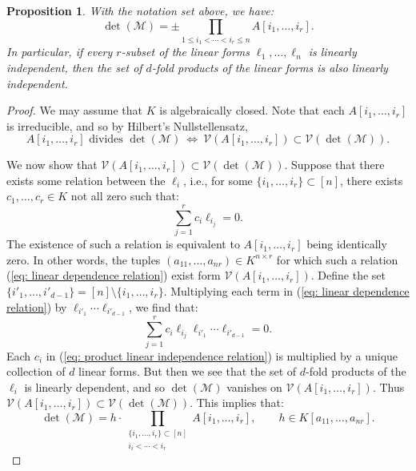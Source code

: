 \documentclass [a4paper,reqno, 11pt]{amsart}
\theoremstyle{plain}
\theoremstyle{plain}
\theoremstyle{plain}
\newtheorem{proposition}[theorem]{Proposition}
\theoremstyle{plain}
\theoremstyle{definition}
\theoremstyle{definition}
\theoremstyle{definition}
\theoremstyle{definition}
\theoremstyle{definition}
\theoremstyle{definition}
\newcommand{\calM}{\mathcal{M}}
\begin{document}
\begin{proposition}\label{prop: linear independence of products}
With the notation set above, we have:
\begin{equation}
\det(\mathcal{M})=\pm\prod_{1\leq i_1<\cdots<i_r\leq n}A[i_1,\ldots, i_r]. 
\end{equation}
In particular, if every $r$-subset of the linear forms $\ell_1,\ldots,\ell_n$ is linearly independent, then the set of $d$-fold products of the linear forms is also linearly independent.
\end{proposition}

\begin{proof}
 We may assume that $K$ is algebraically closed. Note that each \(A[i_1,\ldots, i_r]\) is irreducible, and so by Hilbert's Nullstellensatz,
\[A[i_1,\ldots, i_r]\text{ divides } \det(\mathcal{M}) \ \Leftrightarrow \ \mathcal{V}(A[i_1,\ldots, i_r])\subset \mathcal{V}(\det(\mathcal{M})).\]

We now show that $\mathcal{V}(A[i_1,\ldots, i_r])\subset \mathcal{V}(\det(\mathcal{M}))$. Suppose that there exists some relation between the \(\ell_{i}\), i.e., for some \(\{i_1,\ldots,i_r\}\subset[n]\), there exists \(c_1,\ldots, c_r\in K\) not all zero such that:
\begin{equation}\label{eq: linear dependence relation}
\sum_{j=1}^{r}c_i\ell_{i_j}=0.
\end{equation}
The existence of such a relation is equivalent to \(A[i_1,\ldots, i_r]\) being identically zero. In other words, the tuples \((a_{11},\ldots,a_{nr})\in K^{n\times r}\) for which such a relation (\ref{eq: linear dependence relation}) exist form \(\mathcal{V}(A[i_1,\ldots, i_r])\).
Define the set \(\{i'_1,\ldots,i'_{d-1}\}=[n]\setminus\{i_1,\ldots,i_r\}\). Multiplying each term in (\ref{eq: linear dependence relation}) by \(\ell_{i'_1}\cdots\ell_{i'_{d-1}}\), we find that:
\begin{equation}\label{eq: product linear independence relation}
\sum_{j=1}^{r}c_i\ell_{i_j}\ell_{i'_1}\cdots\ell_{i'_{d-1}}=0.
\end{equation}
Each \(c_i\) in (\ref{eq: product linear independence relation}) is multiplied by a unique collection of \(d\) linear forms.
But then we see that the set of $d$-fold products of the $\ell_i$ is linearly dependent, and so $\det(\calM)$ vanishes on \(\mathcal{V}(A[i_1,\ldots, i_r])\). Thus \(\mathcal{V}(A[i_1,\ldots, i_r])\subset \mathcal{V}(\det(\mathcal{M}))\). This implies that:
\[\det(\mathcal{M})=h\cdot\prod_{\substack{\{i_1,\ldots, i_r\}\subset[n] \\ i_i<\cdots<i_r}}A[i_1,\ldots, i_r],\qquad h\in K[a_{11},\ldots,a_{nr}].\]


\end{proof}
\end{document}
